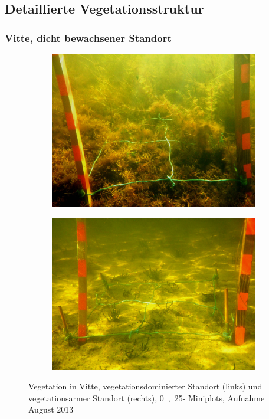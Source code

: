 \subsection{Detaillierte Vegetationsstruktur}


\subsubsection{Vitte, dicht bewachsener Standort}

\begin{figure}[!htb]
        \centering
        \begin{subfigure}[htb]{width=0.45\textwidth}
                \includegraphics[width=\textwidth]{images/plotpictures/BSP_V+M}
        \end{subfigure}
        \begin{subfigure}[htb]{width=0.45\textwidth}
                \includegraphics[width=\textwidth]{images/plotpictures/Bsp_V-M}
        \end{subfigure}
        \caption[Fotoaufnahmen der Vegetation in Vitte]{Vegetation in Vitte, vegetationsdominierter Standort 					(links) und  vegetationsarmer Standort (rechts), \unit{0,25}{\metre\squared}- Miniplots, 						Aufnahme August 2013}
        \label{fig:fotos_vitte}
\end{figure}


